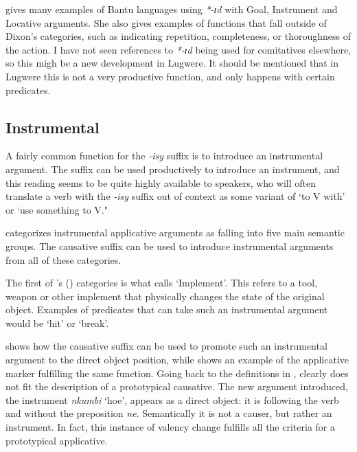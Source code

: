 \documentclass[output=paper,colorlinks,citecolor=brown,draftmode]{langscibook}
\begin{document}
\citet{pacchiarotti2020bantu} gives many examples of Bantu languages using \emph{*-ɪd}
with Goal, Instrument and Locative arguments. She also gives examples of functions that fall outside of Dixon's categories, such as indicating repetition, completeness, or thoroughness of the action. I have not seen references to \emph{*-ɪd} being used for comitatives elsewhere, so this migh be a new development in Lugwere. It should be mentioned that in Lugwere this is not a very productive function, and only happens with certain predicates. 

\subsection{Instrumental} \label{sec:Saebo:instrumental}
A fairly common function for the \emph{-isy} suffix is to introduce an instrumental argument. The suffix can be used productively to introduce an instrument, and this reading seems to be quite highly available to speakers, who will often translate a verb with the \emph{-isy} suffix out of context as some variant of `to V with' or `use something to V."

 \citet{dixon2010basic} categorizes instrumental applicative arguments as falling into five main semantic groups. The causative suffix can be used to introduce instrumental arguments from all of these categories.

The first of \citeauthor{dixon2010basic}'s (\citeyear{dixon2010basic}) categories is what calls ‘Implement’. This refers to a tool, weapon or other implement that physically changes the state of the original object. Examples of predicates that can take such an instrumental argument would be ‘hit’ or ‘break’. 

 shows how the causative suffix can be used to promote such an instrumental argument to the direct object position, while  shows an example of the applicative marker fulfilling the same function. Going back to the definitions in ,  clearly does not fit the description of a prototypical causative. The new argument introduced, the instrument \emph{nkumbi} `hoe', appears as a direct object: it is following the verb and without the preposition \emph{ne}. Semantically it is not a causer, but rather an instrument. In fact, this instance of valency change fulfills all the criteria for a prototypical applicative. 
\end{document}
